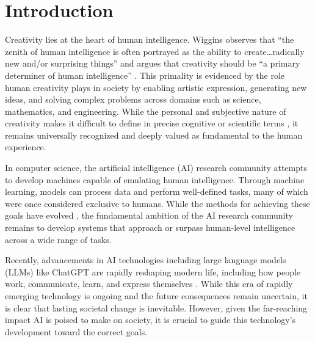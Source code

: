 \documentclass[phd,electronic,oneside,twosidetoc,letterpaper,chaptercenter,parttop,lof]{byumsphd}
\title{\Title}
\author{\Author}
\begin{document}
\maketitle
{}

\chapter{Introduction} 
\label{chap:intro}

Creativity lies at the heart of human intelligence.
Wiggins observes that “the zenith of human intelligence is often portrayed as the ability to create…radically new and/or surprising things” and argues that creativity should be “a primary determiner of human intelligence” \cite{wiggins2006}.
This primality is evidenced by the role human creativity plays in society by enabling artistic expression, generating new ideas, and solving complex problems across domains such as science, mathematics, and engineering.
While the personal and subjective nature of creativity makes it difficult to define in precise cognitive or scientific terms \cite{boden92,Cskszentmihlyi1996CreativityFA,wiggins2006creativity,Simonton2018DefiningCD}, it remains universally recognized and deeply valued as fundamental to the human experience.

In computer science, the artificial intelligence (AI) research community attempts to develop machines capable of emulating human intelligence.
Through machine learning, models can process data and perform well-defined tasks, many of which were once considered exclusive to humans.
While the methods for achieving these goals have evolved \cite{Schmidhuber2022AnnotatedHO}, the fundamental ambition of the AI research community remains to develop systems that approach or surpass human-level intelligence across a wide range of tasks.

Recently, advancements in AI technologies including large language models (LLMs) like ChatGPT \cite{chatGPT} are rapidly reshaping modern life, including how people work, communicate, learn, and express themselves \cite{Gowda2023ArtificialII}. 
While this era of rapidly emerging technology is ongoing and the future consequences remain uncertain, it is clear that lasting societal change is inevitable.
However, given the far-reaching impact AI is poised to make on society, it is crucial to guide this technology's development toward the correct goals. 
\end{document}
